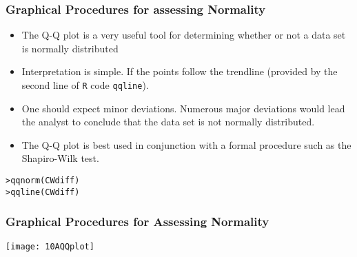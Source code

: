 \documentclass[a4]{beamer}
\begin{document}
\begin{frame}[fragile]
\frametitle{Graphical Procedures for assessing Normality}

\begin{itemize}
\item The Q-Q plot is a very useful tool for determining whether or not a data set is normally distributed
\item Interpretation is simple. If the points follow the trendline (provided by the second line of \texttt{R} code \texttt{qqline}).
\item One should expect minor deviations. Numerous major deviations would lead the analyst to conclude that the data set is not normally distributed.
\item The Q-Q plot is best used in conjunction with a formal procedure such as the Shapiro-Wilk test.
\end{itemize}

\begin{verbatim}
>qqnorm(CWdiff)
>qqline(CWdiff)
\end{verbatim}

\end{frame}


\begin{frame}
\frametitle{Graphical Procedures for Assessing Normality}

\begin{center}
\texttt{[image: 10AQQplot]}
\end{center}
\end{frame}
\end{document}

